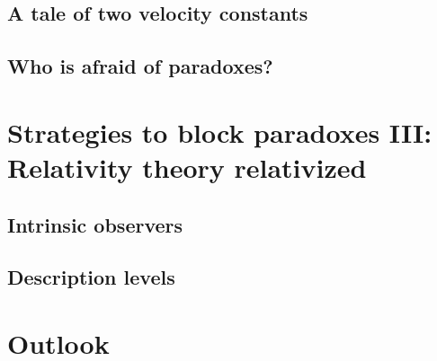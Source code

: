 \section{A tale of two velocity constants}
\section{Who is afraid of paradoxes?}

\chapter{Strategies to block paradoxes III: Relativity theory
relativized}
\section{Intrinsic observers}
\section{Description levels}

\chapter{Outlook}

 
